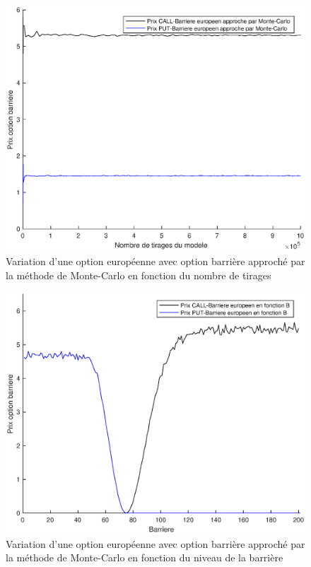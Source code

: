 \begin{figure}[H]
\centering
\includegraphics[scale=0.6]{./img/CALL_PUT_BAR_MC_TIR.eps}
\caption{Variation d'une option européenne avec option barrière approché par la méthode de Monte-Carlo en fonction du nombre de tirages}
\label{fig:call_put__bar_mc_tir}
\end{figure}

\begin{figure}[H]
\centering
\includegraphics[scale=0.6]{./img/CALL_PUT_BAR.eps}
\caption{Variation d'une option européenne avec option barrière approché par la méthode de Monte-Carlo en fonction du niveau de la barrière}
\label{fig:call_put_bar_mc}
\end{figure}

